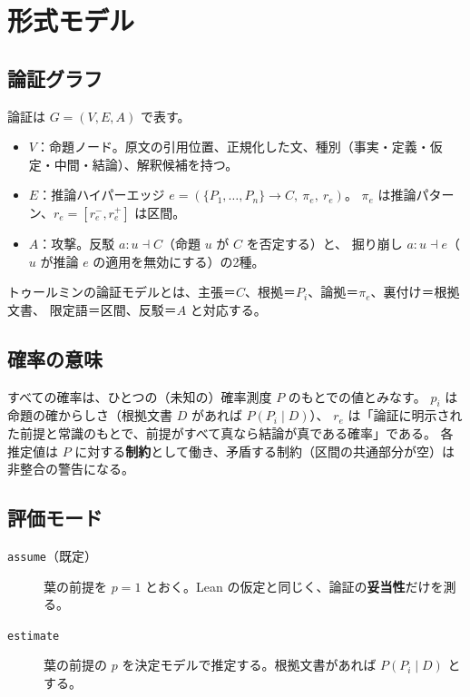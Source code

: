\documentclass[a4paper,11pt]{ltjsarticle}
\begin{document}
\section{形式モデル}

\subsection{論証グラフ}

論証は $G=(V,E,A)$ で表す。
\begin{itemize}
  \item $V$：命題ノード。原文の引用位置、正規化した文、種別（事実・定義・仮定・中間・結論）、解釈候補を持つ。
  \item $E$：推論ハイパーエッジ $e = (\{P_1,\dots,P_n\} \to C,\ \pi_e,\ r_e)$。
        $\pi_e$ は推論パターン、$r_e=[r_e^-, r_e^+]$ は区間。
  \item $A$：攻撃。反駁 $a\colon u \dashv C$（命題 $u$ が $C$ を否定する）と、
        掘り崩し $a\colon u \dashv e$（$u$ が推論 $e$ の適用を無効にする）の2種。
\end{itemize}
トゥールミンの論証モデルとは、主張＝$C$、根拠＝$P_i$、論拠＝$\pi_e$、裏付け＝根拠文書、
限定語＝区間、反駁＝$A$ と対応する。

\subsection{確率の意味}\label{sec:semantics}

すべての確率は、ひとつの（未知の）確率測度 $P$ のもとでの値とみなす。
$p_i$ は命題の確からしさ（根拠文書 $D$ があれば $P(P_i\mid D)$）、
$r_e$ は「論証に明示された前提と常識のもとで、前提がすべて真なら結論が真である確率」である。
各推定値は $P$ に対する\textbf{制約}として働き、矛盾する制約（区間の共通部分が空）は非整合の警告になる。

\subsection{評価モード}

\begin{description}
  \item[\texttt{assume}（既定）] 葉の前提を $p=1$ とおく。Lean の仮定と同じく、論証の\textbf{妥当性}だけを測る。
  \item[\texttt{estimate}] 葉の前提の $p$ を決定モデルで推定する。根拠文書があれば $P(P_i\mid D)$ とする。
\end{description}
\end{document}
